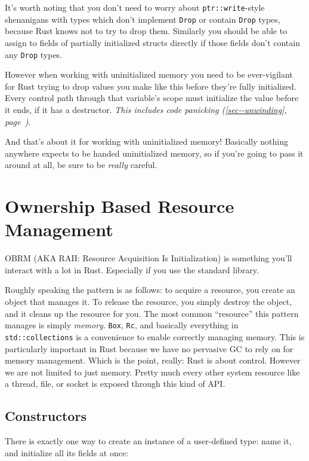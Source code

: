 \documentclass[a4paper,]{book}
\renewcommand*{\hyperlink}[2]{%
 #2 (\autoref{#1}, page~\pageref{#1})}
\begin{document}
It's worth noting that you don't need to worry about
\texttt{ptr::write}-style shenanigans with types which don't implement
\texttt{Drop} or contain \texttt{Drop} types, because Rust knows not to
try to drop them. Similarly you should be able to assign to fields of
partially initialized structs directly if those fields don't contain any
\texttt{Drop} types.

However when working with uninitialized memory you need to be
ever-vigilant for Rust trying to drop values you make like this before
they're fully initialized. Every control path through that variable's
scope must initialize the value before it ends, if it has a destructor.
\emph{\protect\hyperlink{sec--unwinding}{This includes code panicking}}.

And that's about it for working with uninitialized memory! Basically
nothing anywhere expects to be handed uninitialized memory, so if you're
going to pass it around at all, be sure to be \emph{really} careful.

\chapter{Ownership Based Resource Management}\label{sec--obrm}

OBRM (AKA RAII: Resource Acquisition Is Initialization) is something
you'll interact with a lot in Rust. Especially if you use the standard
library.

Roughly speaking the pattern is as follows: to acquire a resource, you
create an object that manages it. To release the resource, you simply
destroy the object, and it cleans up the resource for you. The most
common ``resource'' this pattern manages is simply \emph{memory}.
\texttt{Box}, \texttt{Rc}, and basically everything in
\texttt{std::collections} is a convenience to enable correctly managing
memory. This is particularly important in Rust because we have no
pervasive GC to rely on for memory management. Which is the point,
really: Rust is about control. However we are not limited to just
memory. Pretty much every other system resource like a thread, file, or
socket is exposed through this kind of API.

\section{Constructors}\label{sec--constructors}

There is exactly one way to create an instance of a user-defined type:
name it, and initialize all its fields at once:
\end{document}
